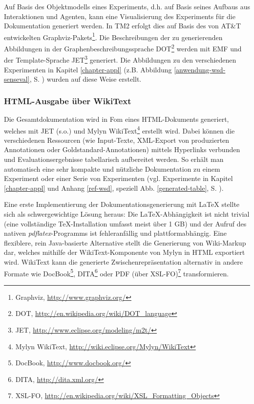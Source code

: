 \documentclass[abstracton, 12pt]{scrartcl}
\begin{document}
Auf Basis des Objektmodells eines Experiments, d.h. auf Basis seines Aufbaus aus Interaktionen und Agenten, kann eine Visualisierung des Experiments für die Dokumentation generiert werden. In TM2 erfolgt dies auf Basis des von AT\&T entwickelten Graphviz-Pakets\footnote{Graphviz, \url{http://www.graphviz.org/}}. Die Beschreibungen der zu generierenden Abbildungen in der Graphenbeschreibungssprache DOT\footnote{DOT, \url{http://en.wikipedia.org/wiki/DOT_language}} werden mit EMF und der Template-Sprache JET\footnote{JET, \url{http://www.eclipse.org/modeling/m2t/}} generiert. Die Abbildungen zu den verschiedenen Experimenten in Kapitel \ref{chapter-appl} (z.B. Abbildung \ref{anwendung-wsd-senseval}, S. \pageref{anwendung-wsd-senseval}) wurden auf diese Weise erstellt.

\subsubsection{HTML-Ausgabe über WikiText}

Die Gesamtdokumentation wird in Fom eines HTML-Dokuments generiert, welches mit JET (s.o.) und Mylyn WikiText\footnote{Mylyn WikiText, \url{http://wiki.eclipse.org/Mylyn/WikiText}} erstellt wird. Dabei können die verschiedenen Ressourcen (wie Input-Texte, XML-Export von produzierten Annotationen oder Goldstandard-Annotationen) mittels Hyperlinks verbunden und Evaluationsergebnisse tabellarisch aufbereitet werden. So erhält man automatisch eine sehr kompakte und nützliche Dokumentation zu einem Experiment oder einer Serie von Experimenten (vgl. Experimente in Kapitel \ref{chapter-appl} und Anhang \ref{ref-wsd}, speziell Abb. \ref{generated-table}, S. \pageref{generated-table}).

Eine erste Implementierung der Dokumentationsgenerierung mit LaTeX stellte sich als schwergewichtige Lösung heraus: Die LaTeX-Abhängigkeit ist nicht trivial (eine vollständige TeX-Installation umfasst meist über 1 GB) und der Aufruf des nativen \emph{pdflatex}-Programms ist fehleranfällig und plattformabhängig. Eine flexiblere, rein Java-basierte Alternative stellt die Generierung von Wiki-Markup dar, welches mithilfe der WikiText-Komponente von Mylyn in HTML exportiert wird. WikiText kann die generierte Zwischenrepräsentation alternativ in andere Formate wie DocBook\footnote{DocBook, \url{http://www.docbook.org/}}, DITA\footnote{DITA, \url{http://dita.xml.org/}} oder PDF (über XSL-FO)\footnote{XSL-FO, \url{http://en.wikipedia.org/wiki/XSL_Formatting_Objects}} transformieren.
\end{document}
